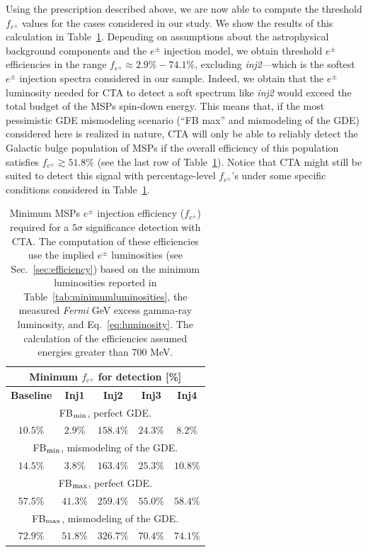 \documentclass[doublespace,nopageskip]{VTthesis} %
\begin{document}
Using the prescription described above, we are now able to compute the threshold $f_{e^\pm}$ values for the cases considered in our study. We show the results of this calculation in Table~\ref{tab:minimumfe}. Depending on assumptions about the astrophysical background components and the $e^\pm$ injection model, we obtain threshold $e^\pm$ efficiencies in the range $f_{e^\pm}\approx 2.9\%-74.1\%$, excluding \textit{inj2}---which is the softest $e^\pm$ injection spectra considered in our sample. Indeed, we obtain that the $e^\pm$ luminosity needed for CTA to detect a soft spectrum like \textit{inj2} would exceed the total budget of the MSPs spin-down energy. This means that, if the most pessimistic GDE mismodeling scenario (``FB max'' and mismodeling of the GDE) considered here is realized in nature,
CTA will only be able to reliably detect the Galactic bulge population of MSPs if the overall efficiency of this population satisfies $f_{e^\pm}\gtrsim 51.8\%$ (see the last row of Table~\ref{tab:minimumfe}). Notice that CTA might still be suited to detect this signal with percentage-level $f_{e^\pm}$'s under some specific conditions considered in Table~\ref{tab:minimumfe}.

\begin{table}[htb]
  \begin{center}
    \caption{Minimum MSPs $e^{\pm}$ injection efficiency ($f_{e^\pm}$) required for a $5\sigma$ significance detection with CTA. The computation of these efficiencies use the implied $e^\pm$ luminosities (see Sec.~\ref{sec:efficiency}) based on the minimum luminosities reported in Table~\ref{tab:minimumluminosities}, the measured \textit{Fermi} GeV excess gamma-ray luminosity, and Eq.~\ref{eq:luminosity}. The calculation of the efficiencies assumed energies greater than 700 MeV.}
    \begin{tabular}{c|c|c|c|c}
    \toprule
     \multicolumn{5}{c}{ Minimum $f_{e^\pm}$ for detection [\%]}   \tabularnewline 
     \midrule
     \textbf{Baseline} & \textbf{Inj1} & \textbf{Inj2} & \textbf{Inj3} & \textbf{Inj4}\tabularnewline 
     \midrule
     \multicolumn{5}{c}{ 
     FB$_{\rm min}$, perfect GDE.}   \tabularnewline 
     \midrule
     $10.5\%$ & $2.9\%$ & $158.4\%$ & $24.3\%$ & $8.2\%$\tabularnewline 
     \midrule
     \multicolumn{5}{c}{ 
     FB$_{\rm min}$, mismodeling of the GDE.}\tabularnewline 
     \midrule
     $14.5\%$ & $3.8\%$ & $163.4\%$ & $25.3\%$ & $10.8\%$\tabularnewline 
     \midrule
     \multicolumn{5}{c}{ FB$_{\rm max}$, perfect GDE.}\tabularnewline 
     \midrule
     $57.5\%$ & $41.3\%$ & $259.4\%$ & $55.0\%$ & $58.4\%$\tabularnewline 
     \midrule
     \multicolumn{5}{c}{FB$_{\rm max}$, mismodeling of the GDE.}\tabularnewline 
     \midrule
     $72.9\%$ & $51.8\%$ & $326.7\%$ & $70.4\%$ & $74.1\%$\tabularnewline 
     \bottomrule
    \end{tabular}
    \label{tab:minimumfe}
  \end{center}
\end{table}
\end{document}
